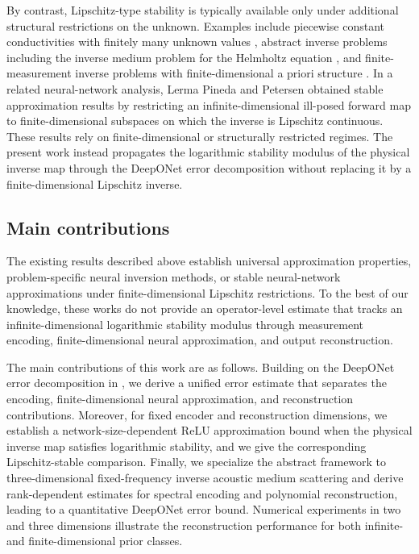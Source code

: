 \documentclass{article}
\numberwithin{equation}{section}
\theoremstyle{plain}
\newcounter{method}
\begin{document}
	By contrast, Lipschitz-type stability is typically available only under additional structural restrictions on the unknown. Examples include piecewise constant conductivities with finitely many unknown values \cite{AV05}, abstract inverse problems including the inverse medium problem for the Helmholtz equation \cite{Bou13}, and finite-measurement inverse problems with finite-dimensional a priori structure \cite{AS22}. In a related neural-network analysis, Lerma Pineda and Petersen \cite{LP23} obtained stable approximation results by restricting an infinite-dimensional ill-posed forward map to
	finite-dimensional subspaces on which the inverse is Lipschitz
	continuous. These results rely on finite-dimensional or structurally restricted regimes. The present work instead propagates the logarithmic stability modulus of the physical inverse map through the DeepONet error decomposition without replacing it by a finite-dimensional Lipschitz inverse.
	
	\subsection{Main contributions}
	
	The existing results described above establish universal approximation properties, problem-specific neural inversion methods, or stable neural-network approximations under finite-dimensional Lipschitz restrictions. To the best of our knowledge, these works do not provide an operator-level estimate that tracks an infinite-dimensional logarithmic stability modulus through measurement encoding, finite-dimensional neural approximation, and output reconstruction.
	
	The main contributions of this work are as follows. Building on the DeepONet error decomposition in \cite{LMK22}, we derive a unified error estimate that separates the encoding, finite-dimensional neural approximation, and reconstruction contributions. Moreover, for fixed encoder and reconstruction dimensions, we establish a network-size-dependent ReLU approximation bound when the physical inverse map satisfies logarithmic stability, and we give the corresponding Lipschitz-stable comparison. Finally, we specialize the abstract framework to three-dimensional fixed-frequency inverse acoustic medium scattering and derive rank-dependent estimates for spectral encoding and polynomial reconstruction, leading to a quantitative DeepONet error bound. Numerical experiments in two and three dimensions illustrate the reconstruction performance for both infinite- and finite-dimensional prior classes.
	
\end{document}
